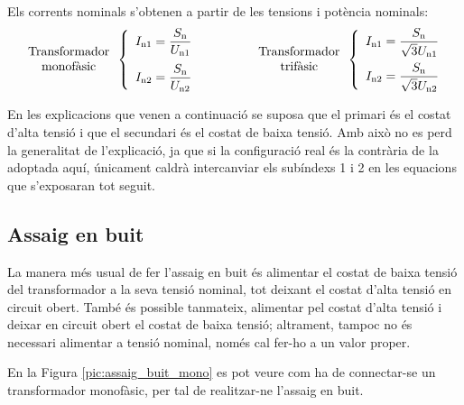 Els corrents nominals s'obtenen a partir de les tensions i potència
nominals:
\begin{equation}
\begin{array}{c}\text{Transformador}\\
\text{monofàsic}
\end{array} \left\{
\begin{array}{l}
   I_\mathrm{n1} = \dfrac{S_\mathrm{n}}{U_\mathrm{n1}} \\[2.7ex]
   I_\mathrm{n2} = \dfrac{S_\mathrm{n}}{U_\mathrm{n2}}
\end{array}
\right. \qquad\qquad
\begin{array}{c}\text{Transformador}\\
\text{trifàsic}
\end{array} \left\{
\begin{array}{l}
   I_\mathrm{n1} = \dfrac{S_\mathrm{n}}{\sqrt{3}U_\mathrm{n1}} \\[2.5ex]
   I_\mathrm{n2} = \dfrac{S_\mathrm{n}}{\sqrt{3}U_\mathrm{n2}}
\end{array}
\right.
\end{equation}

En les explicacions que venen a continuació se suposa que el
primari és el costat d'alta tensió i que el secundari és el costat
de baixa tensió. Amb això no es perd la generalitat de
l'explicació, ja que si la configuració real és la contrària de la
adoptada aquí, únicament caldrà intercanviar els subíndexs 1 i 2 en
les equacions que s'exposaran tot seguit.

\subsection{Assaig en buit}

La manera més usual de fer l'assaig en buit és alimentar el costat
de baixa tensió del transformador a  la seva tensió nominal, tot
deixant el costat d'alta tensió en circuit obert. També és possible
tanmateix, alimentar pel costat d'alta tensió i deixar en circuit
obert el costat de baixa tensió; altrament, tampoc no és necessari
alimentar a tensió nominal, només cal fer-ho a un valor proper.

En la Figura \vref{pic:assaig_buit_mono} es pot veure com ha de
connectar-se un transformador monofàsic, per tal de realitzar-ne
l'assaig en buit.

\begin{center}
    
    \label{pic:assaig_buit_mono}
\end{center}

